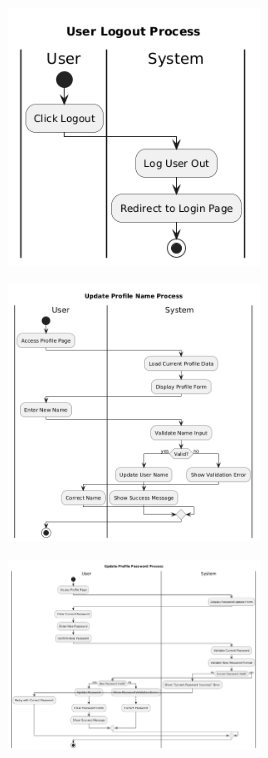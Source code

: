 \begin{center}
    \includegraphics[width=0.5\textwidth]{assets/activity_diagrams/user_logout.png}
\end{center}

\begin{center}
    \includegraphics[width=0.5\textwidth]{assets/activity_diagrams/user_profile_update_name.png}
\end{center}

\begin{center}
    \includegraphics[width=0.5\textwidth]{assets/activity_diagrams/user_profile_update_password.png}
\end{center}

